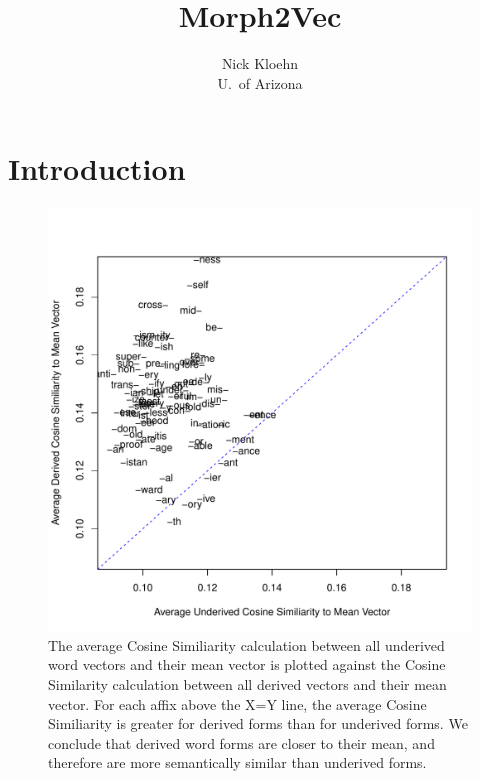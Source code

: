 \documentclass[12pt]{article}\usepackage[]{graphicx}\usepackage[]{color}
\title{Morph2Vec}
\author{Nick Kloehn \\
U.\ of Arizona}
\makeatletter
\def\maxwidth{ %
  \ifdim\Gin@nat@width>\linewidth
    \linewidth
  \else
    \Gin@nat@width
  \fi
}
\newenvironment{knitrout}{}{} %
\makeatother
\begin{document}
\maketitle
\section{Introduction}

\begin{knitrout}
\color{fgcolor}\begin{figure}
\includegraphics[width=\maxwidth]{figure/MeanPlot-1} \caption{The average Cosine Similiarity calculation between all underived word vectors and their mean vector is plotted against the Cosine Similarity calculation between all derived vectors and their mean vector. For each affix above the X=Y line, the average Cosine Similiarity is greater for derived forms than for underived forms. We conclude that derived word forms are closer to their mean, and therefore are more semantically similar than underived forms.\label{fig.MeanPlot}}\label{fig:MeanPlot}
\end{figure}


\end{knitrout}
\end{document}
